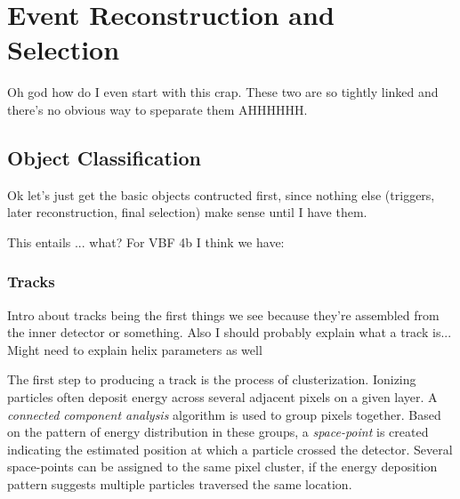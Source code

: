 \chapter{Event Reconstruction and Selection}

    Oh god how do I even start with this crap. These two are so tightly linked and there's no obvious way to speparate them AHHHHHH.
    
%


\section{Object Classification}

    Ok let's just get the basic objects contructed first, since nothing else (triggers, later reconstruction, final selection)
        make sense until I have them.

    This entails ... what? For VBF 4b I think we have:


    \subsection{Tracks}
        Intro about tracks being the first things we see because they're assembled from the inner detector or something.
        Also I should probably explain what a track is...
        Might need to explain helix parameters as well

        The first step to producing a track is the process of clusterization.
        Ionizing particles often deposit energy across several adjacent pixels on a given layer.
        A \textit{connected component analysis} algorithm is used to group pixels together. 
        Based on the pattern of energy distribution in these groups,
            a \textit{space-point} is created indicating the estimated position at which a particle crossed the detector.
        Several space-points can be assigned to the same pixel cluster,
            if the energy deposition pattern suggests multiple particles traversed the same location.

